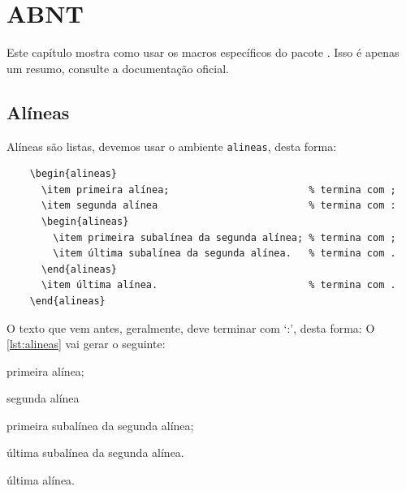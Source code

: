 \chapter{ABNT} \label{chap:fundamentacao}

Este capítulo mostra como usar os macros específicos do pacote \abntex. Isso é apenas um resumo, consulte a documentação oficial.

\section{Alíneas}

Alíneas são listas, devemos usar o ambiente \texttt{alineas}, desta forma:

\begin{listing}[htb]
  \begin{verbatim}
    \begin{alineas}
      \item primeira alínea;                        % termina com ;
      \item segunda alínea                          % termina com :
      \begin{alineas}
        \item primeira subalínea da segunda alínea; % termina com ;
        \item última subalínea da segunda alínea.   % termina com .
      \end{alineas}
      \item última alínea.                          % termina com .
    \end{alineas}
  \end{verbatim}
  \caption{Alíneas}
  \label{lst:alineas}
\end{listing}

O texto que vem antes, geralmente, deve terminar com \enquote*{:}, desta forma: O \autoref{lst:alineas} vai gerar o seguinte:

\begin{alineas}
  \item primeira alínea;                        %
  \item segunda alínea                          %
  \begin{alineas}
    \item primeira subalínea da segunda alínea; %
    \item última subalínea da segunda alínea.   %
  \end{alineas}
  \item última alínea.                          %
\end{alineas}

